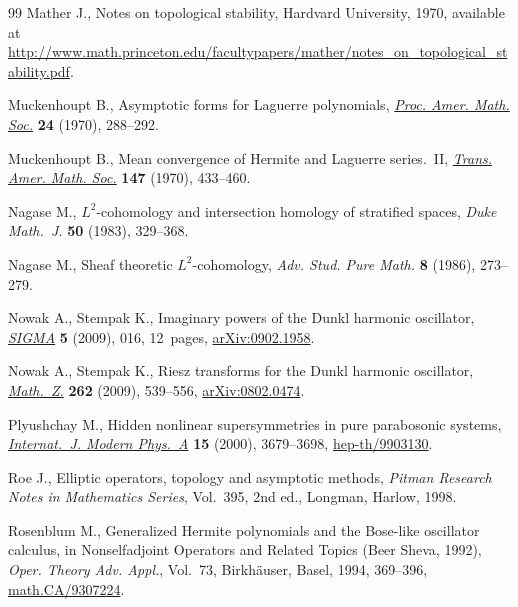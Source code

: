 \documentclass[11pt]{article}
\begin{document}
\begin{thebibliography}{99}
Mather J., Notes on topological stability, Hardvard University, 1970, available at
  \url{http://www.math.princeton.edu/facultypapers/mather/notes_on_topological_stability.pdf}.

Muckenhoupt B., Asymptotic forms for {L}aguerre polynomials, \href{http://dx.doi.org/10.1090/S0002-9939-1970-0251272-9}{\textit{Proc.
  Amer. Math. Soc.}} \textbf{24} (1970), 288--292.

Muckenhoupt B., Mean convergence of {H}ermite and {L}aguerre series.~{II},
  \href{http://dx.doi.org/10.1090/S0002-9947-1970-0256051-9}{\textit{Trans. Amer. Math. Soc.}} \textbf{147} (1970), 433--460.

Nagase M., {$L^{2}$}-cohomology and intersection homology of stratif\/ied spaces,
\textit{Duke Math.~J.} \textbf{50} (1983), 329--368.

Nagase M., Sheaf theoretic {$L^2$}-cohomology, \textit{Adv. Stud. Pure Math.}
  \textbf{8} (1986), 273--279.

Nowak A., Stempak K., Imaginary powers of the {D}unkl harmonic oscillator,
  \href{http://dx.doi.org/10.3842/SIGMA.2009.016}{\textit{SIGMA}} \textbf{5} (2009), 016, 12~pages, \href{http://arxiv.org/abs/0902.1958}{arXiv:0902.1958}.

Nowak A., Stempak K., Riesz transforms for the {D}unkl harmonic oscillator,
  \href{http://dx.doi.org/10.1007/s00209-008-0388-4}{\textit{Math.~Z.}} \textbf{262} (2009), 539--556, \href{http://arxiv.org/abs/0802.0474}{arXiv:0802.0474}.

Plyushchay M., Hidden nonlinear supersymmetries in pure parabosonic systems,
  \href{http://dx.doi.org/10.1142/S0217751X0000198X}{\textit{Internat.~J. Modern Phys.~A}} \textbf{15} (2000), 3679--3698,
  \href{http://arxiv.org/abs/hep-th/9903130}{hep-th/9903130}.

Roe J., Elliptic operators, topology and asymptotic methods, \textit{Pitman
  Research Notes in Mathematics Series}, Vol.~395, 2nd ed., Longman, Harlow,
  1998.

Rosenblum M., Generalized {H}ermite polynomials and the {B}ose-like oscillator
  calculus, in Nonselfadjoint Operators and Related Topics ({B}eer {S}heva,
  1992), \textit{Oper. Theory Adv. Appl.}, Vol.~73, Birkh\"auser, Basel, 1994,
  369--396, \href{http://arxiv.org/abs/math.CA/9307224}{math.CA/9307224}.


\end{thebibliography}
\end{document}
